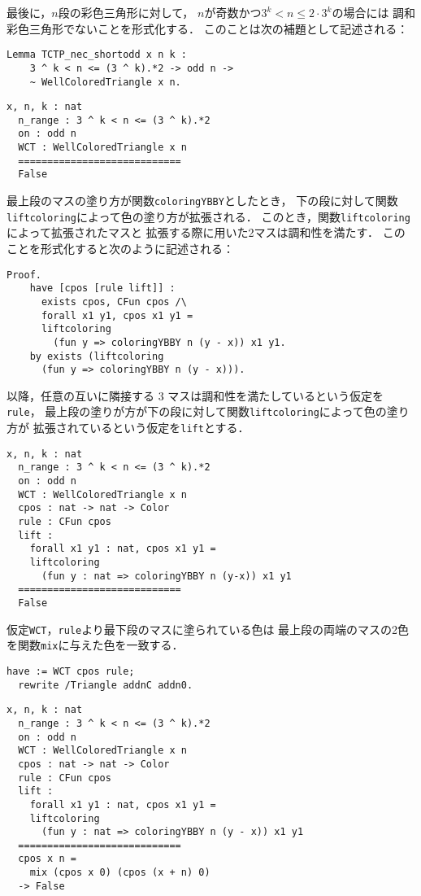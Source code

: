 最後に，$n$段の彩色三角形に対して，
$n$が奇数かつ$3^{k} < n \leq 2 \cdot 3^{k}$の場合には
調和彩色三角形でないことを形式化する．
このことは次の補題として記述される：
\begin{lstlisting}[language=Coq]
  Lemma TCTP_nec_shortodd x n k :
    3 ^ k < n <= (3 ^ k).*2 -> odd n ->
    ~ WellColoredTriangle x n.
\end{lstlisting}
\begin{lstlisting}[language=Coq]
  x, n, k : nat
  n_range : 3 ^ k < n <= (3 ^ k).*2
  on : odd n
  WCT : WellColoredTriangle x n
  ============================
  False
\end{lstlisting}
最上段のマスの塗り方が関数{\tt{coloringYBBY}}としたとき，
下の段に対して関数{\tt{liftcoloring}}によって色の塗り方が拡張される．
このとき，関数{\tt{liftcoloring}}によって拡張されたマスと
拡張する際に用いた2マスは調和性を満たす．
このことを形式化すると次のように記述される：
\begin{lstlisting}[language=Coq]
  Proof.
    have [cpos [rule lift]] :
      exists cpos, CFun cpos /\
      forall x1 y1, cpos x1 y1 =
      liftcoloring
        (fun y => coloringYBBY n (y - x)) x1 y1.
    by exists (liftcoloring
      (fun y => coloringYBBY n (y - x))).
\end{lstlisting}
以降，任意の互いに隣接する 3 マスは調和性を満たしているという仮定を{\tt{rule}}，
最上段の塗りが方が下の段に対して関数{\tt{liftcoloring}}によって色の塗り方が
拡張されているという仮定を{\tt{lift}}とする．
\begin{lstlisting}[language=Coq]
  x, n, k : nat
  n_range : 3 ^ k < n <= (3 ^ k).*2
  on : odd n
  WCT : WellColoredTriangle x n
  cpos : nat -> nat -> Color
  rule : CFun cpos
  lift :
    forall x1 y1 : nat, cpos x1 y1 =
    liftcoloring
      (fun y : nat => coloringYBBY n (y-x)) x1 y1
  ============================
  False
\end{lstlisting}
仮定{\tt{WCT}}，{\tt{rule}}より最下段のマスに塗られている色は
最上段の両端のマスの2色を関数{\tt{mix}}に与えた色を一致する．
\begin{lstlisting}[language=Coq]
  have := WCT cpos rule;
  rewrite /Triangle addnC addn0.
\end{lstlisting}
\begin{lstlisting}[language=Coq]
  x, n, k : nat
  n_range : 3 ^ k < n <= (3 ^ k).*2
  on : odd n
  WCT : WellColoredTriangle x n
  cpos : nat -> nat -> Color
  rule : CFun cpos
  lift :
    forall x1 y1 : nat, cpos x1 y1 =
    liftcoloring
      (fun y : nat => coloringYBBY n (y - x)) x1 y1
  ============================
  cpos x n =
    mix (cpos x 0) (cpos (x + n) 0)
  -> False
\end{lstlisting}

